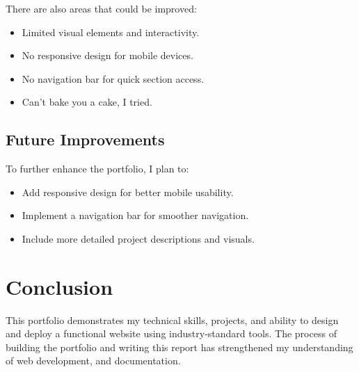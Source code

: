 \documentclass[12pt]{article}
\begin{document}
There are also areas that could be improved:

\begin{itemize}
    \item Limited visual elements and interactivity.
    \item No responsive design for mobile devices.
    \item No navigation bar for quick section access.
    \item Can't bake you a cake, I tried.
\end{itemize}

\subsection*{Future Improvements}

To further enhance the portfolio, I plan to:

\begin{itemize}
    \item Add responsive design for better mobile usability.
    \item Implement a navigation bar for smoother navigation.
    \item Include more detailed project descriptions and visuals.
\end{itemize}

\section{Conclusion}

This portfolio demonstrates my technical skills, projects, and ability to design and deploy a functional website using industry-standard tools. The process of building the portfolio and writing this report has strengthened my understanding of web development, and documentation. 
\end{document}
